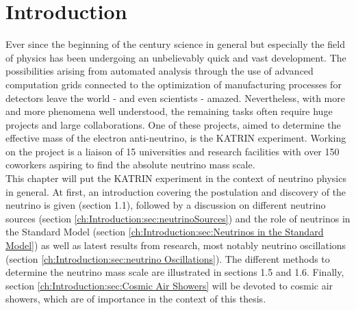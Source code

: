 
\chapter{Introduction}
\label{ch:Introduction}
	Ever since the beginning of the  century science in general but especially the field of physics has been undergoing an unbelievably quick and vast development. The possibilities arising from automated analysis through the use of advanced computation grids connected to the optimization of manufacturing processes for detectors leave the world - and even scientists - amazed. Nevertheless, with more and more phenomena well understood, the remaining tasks often require huge projects and large collaborations. One of these projects, aimed to determine the effective mass of the electron anti-neutrino, is the KATRIN experiment.
	Working on the project is a liaison of 15 universities and research facilities with over 150 coworkers aspiring to find the absolute neutrino mass scale.\\
	This chapter will put the KATRIN experiment in the context of neutrino physics in general. At first, an introduction covering the postulation and discovery of the neutrino is given (section 1.1), followed by a discussion on different neutrino sources (section \ref{ch:Introduction:sec:neutrinoSources}) and the role of neutrinos in the Standard Model (section \ref{ch:Introduction:sec:Neutrinos in the Standard Model}) as well as latest results from research, most notably neutrino oscillations (section \ref{ch:Introduction:sec:neutrino Oscillations}). The different methods to determine the neutrino mass scale are illustrated in sections 1.5 and 1.6.
	Finally, section \ref{ch:Introduction:sec:Cosmic Air Showers} will be devoted to cosmic air showers, which are of importance in the context of this thesis.
	
